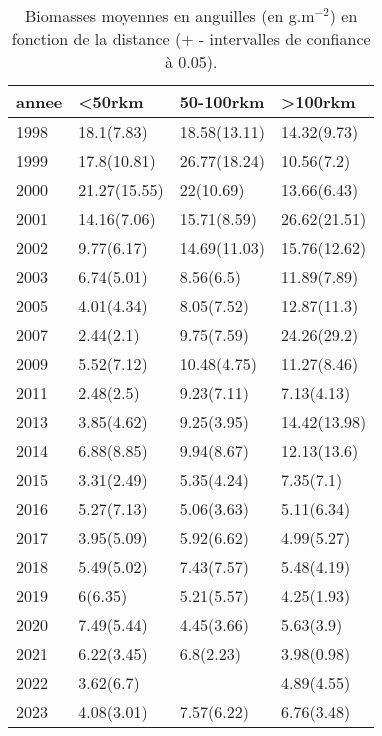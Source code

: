 \begin{table}[htbp]
\centering
\caption[Biomasse et distance.]{Biomasses moyennes en anguilles (en g.m$^{-2}$) en fonction de la distance (+ - intervalles de confiance à 0.05).} 
\label{table_biom_dist_annee}
\begin{tabular}{llll}
  \hline
annee & <50rkm & 50-100rkm & >100rkm \\ 
  \hline
1998 & 18.1(7.83) & 18.58(13.11) & 14.32(9.73) \\ 
  1999 & 17.8(10.81) & 26.77(18.24) & 10.56(7.2) \\ 
  2000 & 21.27(15.55) & 22(10.69) & 13.66(6.43) \\ 
  2001 & 14.16(7.06) & 15.71(8.59) & 26.62(21.51) \\ 
  2002 & 9.77(6.17) & 14.69(11.03) & 15.76(12.62) \\ 
  2003 & 6.74(5.01) & 8.56(6.5) & 11.89(7.89) \\ 
  2005 & 4.01(4.34) & 8.05(7.52) & 12.87(11.3) \\ 
  2007 & 2.44(2.1) & 9.75(7.59) & 24.26(29.2) \\ 
  2009 & 5.52(7.12) & 10.48(4.75) & 11.27(8.46) \\ 
  2011 & 2.48(2.5) & 9.23(7.11) & 7.13(4.13) \\ 
  2013 & 3.85(4.62) & 9.25(3.95) & 14.42(13.98) \\ 
  2014 & 6.88(8.85) & 9.94(8.67) & 12.13(13.6) \\ 
  2015 & 3.31(2.49) & 5.35(4.24) & 7.35(7.1) \\ 
  2016 & 5.27(7.13) & 5.06(3.63) & 5.11(6.34) \\ 
  2017 & 3.95(5.09) & 5.92(6.62) & 4.99(5.27) \\ 
  2018 & 5.49(5.02) & 7.43(7.57) & 5.48(4.19) \\ 
  2019 & 6(6.35) & 5.21(5.57) & 4.25(1.93) \\ 
  2020 & 7.49(5.44) & 4.45(3.66) & 5.63(3.9) \\ 
  2021 & 6.22(3.45) & 6.8(2.23) & 3.98(0.98) \\ 
  2022 & 3.62(6.7) &  & 4.89(4.55) \\ 
  2023 & 4.08(3.01) & 7.57(6.22) & 6.76(3.48) \\ 
   \hline
\end{tabular}
\end{table}
